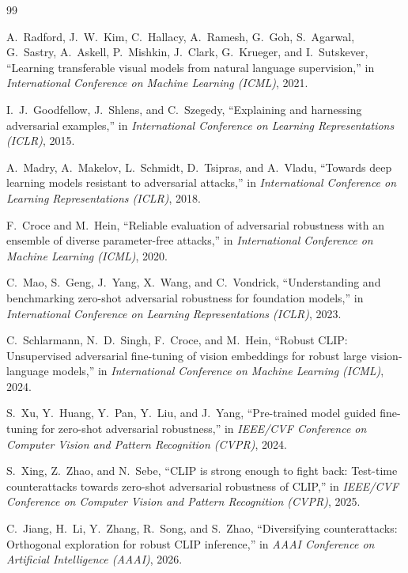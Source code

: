 \documentclass[12pt,a4paper]{article}
\begin{document}
\begin{thebibliography}{99}

A.~Radford, J.~W.~Kim, C.~Hallacy, A.~Ramesh, G.~Goh, S.~Agarwal, G.~Sastry, A.~Askell, P.~Mishkin, J.~Clark, G.~Krueger, and I.~Sutskever,
``Learning transferable visual models from natural language supervision,''
in \emph{International Conference on Machine Learning (ICML)}, 2021.

I.~J.~Goodfellow, J.~Shlens, and C.~Szegedy,
``Explaining and harnessing adversarial examples,''
in \emph{International Conference on Learning Representations (ICLR)}, 2015.

A.~Madry, A.~Makelov, L.~Schmidt, D.~Tsipras, and A.~Vladu,
``Towards deep learning models resistant to adversarial attacks,''
in \emph{International Conference on Learning Representations (ICLR)}, 2018.

F.~Croce and M.~Hein,
``Reliable evaluation of adversarial robustness with an ensemble of diverse parameter-free attacks,''
in \emph{International Conference on Machine Learning (ICML)}, 2020.

C.~Mao, S.~Geng, J.~Yang, X.~Wang, and C.~Vondrick,
``Understanding and benchmarking zero-shot adversarial robustness for foundation models,''
in \emph{International Conference on Learning Representations (ICLR)}, 2023.

C.~Schlarmann, N.~D.~Singh, F.~Croce, and M.~Hein,
``Robust CLIP: Unsupervised adversarial fine-tuning of vision embeddings for robust large vision-language models,''
in \emph{International Conference on Machine Learning (ICML)}, 2024.

S.~Xu, Y.~Huang, Y.~Pan, Y.~Liu, and J.~Yang,
``Pre-trained model guided fine-tuning for zero-shot adversarial robustness,''
in \emph{IEEE/CVF Conference on Computer Vision and Pattern Recognition (CVPR)}, 2024.

S.~Xing, Z.~Zhao, and N.~Sebe,
``CLIP is strong enough to fight back: Test-time counterattacks towards zero-shot adversarial robustness of CLIP,''
in \emph{IEEE/CVF Conference on Computer Vision and Pattern Recognition (CVPR)}, 2025.

C.~Jiang, H.~Li, Y.~Zhang, R.~Song, and S.~Zhao,
``Diversifying counterattacks: Orthogonal exploration for robust CLIP inference,''
in \emph{AAAI Conference on Artificial Intelligence (AAAI)}, 2026.


\end{thebibliography}
\end{document}
